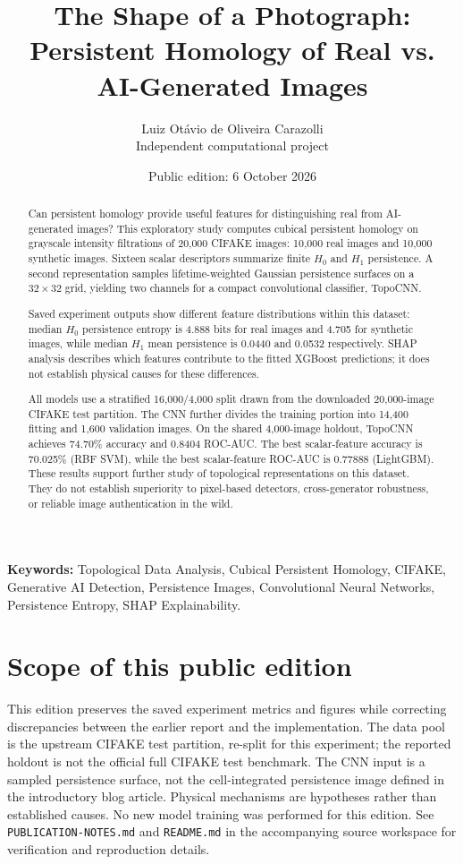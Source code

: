 \documentclass[11pt,a4paper]{article}
\title{\textbf{The Shape of a Photograph:}\\
\Large Persistent Homology of Real vs. AI-Generated Images}
\author{Luiz Otávio de Oliveira Carazolli\\\small Independent computational project}
\date{Public edition: 6 October 2026}
\begin{document}
\maketitle

\begin{abstract}
Can persistent homology provide useful features for distinguishing real from AI-generated images? This exploratory study computes cubical persistent homology on grayscale intensity filtrations of 20,000 CIFAKE images: 10,000 real images and 10,000 synthetic images. Sixteen scalar descriptors summarize finite $H_0$ and $H_1$ persistence. A second representation samples lifetime-weighted Gaussian persistence surfaces on a $32\times32$ grid, yielding two channels for a compact convolutional classifier, TopoCNN.

Saved experiment outputs show different feature distributions within this dataset: median $H_0$ persistence entropy is 4.888 bits for real images and 4.705 for synthetic images, while median $H_1$ mean persistence is 0.0440 and 0.0532 respectively. SHAP analysis describes which features contribute to the fitted XGBoost predictions; it does not establish physical causes for these differences.

All models use a stratified 16,000/4,000 split drawn from the downloaded 20,000-image CIFAKE test partition. The CNN further divides the training portion into 14,400 fitting and 1,600 validation images. On the shared 4,000-image holdout, TopoCNN achieves 74.70\% accuracy and 0.8404 ROC-AUC. The best scalar-feature accuracy is 70.025\% (RBF SVM), while the best scalar-feature ROC-AUC is 0.77888 (LightGBM). These results support further study of topological representations on this dataset. They do not establish superiority to pixel-based detectors, cross-generator robustness, or reliable image authentication in the wild.
\end{abstract}

\vspace{1em}
\noindent\textbf{Keywords:} Topological Data Analysis, Cubical Persistent Homology, CIFAKE, Generative AI Detection, Persistence Images, Convolutional Neural Networks, Persistence Entropy, SHAP Explainability.

\newpage
\section*{Scope of this public edition}
This edition preserves the saved experiment metrics and figures while correcting discrepancies between the earlier report and the implementation. The data pool is the upstream CIFAKE test partition, re-split for this experiment; the reported holdout is not the official full CIFAKE test benchmark. The CNN input is a sampled persistence surface, not the cell-integrated persistence image defined in the introductory blog article. Physical mechanisms are hypotheses rather than established causes. No new model training was performed for this edition. See \texttt{PUBLICATION-NOTES.md} and \texttt{README.md} in the accompanying source workspace for verification and reproduction details.
{\small\tableofcontents}
\newpage
\end{document}
